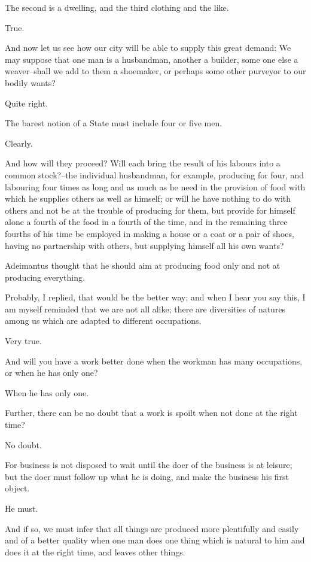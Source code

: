 The second is a dwelling, and the third clothing and the like.

True.

And now let us see how our city will be able to supply this great
demand: We may suppose that one man is a husbandman, another a builder,
some one else a weaver--shall we add to them a shoemaker, or perhaps
some other purveyor to our bodily wants?

Quite right.

The barest notion of a State must include four or five men.

Clearly.

And how will they proceed? Will each bring the result of his labours
into a common stock?--the individual husbandman, for example, producing
for four, and labouring four times as long and as much as he need in the
provision of food with which he supplies others as well as himself;
or will he have nothing to do with others and not be at the trouble of
producing for them, but provide for himself alone a fourth of the food
in a fourth of the time, and in the remaining three fourths of his time
be employed in making a house or a coat or a pair of shoes, having no
partnership with others, but supplying himself all his own wants?

Adeimantus thought that he should aim at producing food only and not at
producing everything.

Probably, I replied, that would be the better way; and when I hear you
say this, I am myself reminded that we are not all alike; there
are diversities of natures among us which are adapted to different
occupations.

Very true.

And will you have a work better done when the workman has many
occupations, or when he has only one?

When he has only one.

Further, there can be no doubt that a work is spoilt when not done at
the right time?

No doubt.

For business is not disposed to wait until the doer of the business is
at leisure; but the doer must follow up what he is doing, and make the
business his first object.

He must.

And if so, we must infer that all things are produced more plentifully
and easily and of a better quality when one man does one thing which is
natural to him and does it at the right time, and leaves other things.

